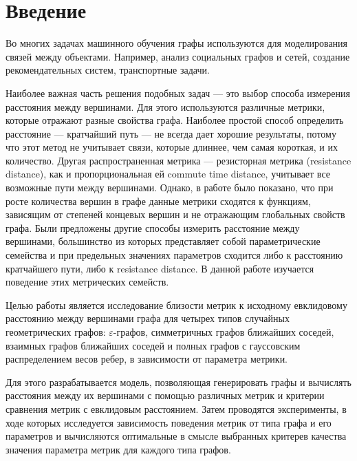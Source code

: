 \chapter*{Введение}							%

Во многих задачах машинного обучения графы используются для моделирования связей между объектами. Например, анализ социальных графов и сетей, создание рекомендательных систем, транспортные задачи.

Наиболее важная часть решения подобных задач --- это выбор способа измерения расстояния между вершинами. Для этого используются различные метрики, которые отражают разные свойства графа. Наиболее простой способ определить расстояние --- кратчайший путь --- не всегда дает хорошие результаты, потому что этот метод не учитывает связи, которые длиннее, чем самая короткая, и их количество. Другая распространенная метрика --- резисторная метрика (resistance distance), как и пропорциональная ей commute time distance, учитывает все возможные пути между вершинами. Однако, в работе \cite{von2014hitting} было показано, что при росте количества вершин в графе данные метрики сходятся к функциям, зависящим от степеней концевых вершин и не отражающим глобальных свойств графа. Были предложены другие способы измерить расстояние между вершинами, большинство из которых представляет собой параметрические семейства и при предельных значениях параметров сходится либо к расстоянию кратчайшего пути, либо к resistance distance. В данной работе изучается поведение этих метрических семейств.

Целью работы является исследование близости метрик к исходному евклидовому расстоянию между вершинами графа для четырех типов случайных геометрических графов:  $\varepsilon$-графов, симметричных графов ближайших соседей, взаимных графов ближайших соседей и полных графов с гауссовским распределением весов ребер, в зависимости от параметра метрики.

Для этого разрабатывается модель, позволяющая генерировать графы и вычислять расстояния между их вершинами с помощью различных метрик и критерии сравнения метрик с евклидовым расстоянием. Затем проводятся эксперименты, в ходе которых исследуется зависимость поведения метрик от типа графа и его параметров и вычисляются оптимальные в смысле выбранных критерев качества значения параметра метрик для каждого типа графов.


\clearpage